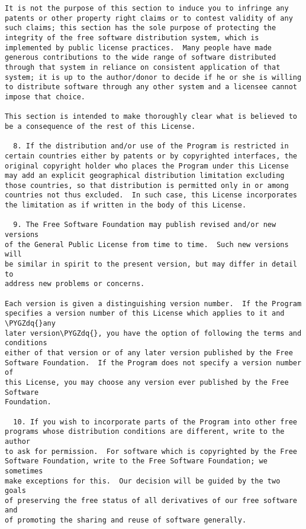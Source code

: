 \documentclass[letterpaper,10pt,english]{sphinxmanual}
\def\PYGZdq{\char`\"}
\begin{document}
\begin{Verbatim}[commandchars=\\\{\}]
It is not the purpose of this section to induce you to infringe any
patents or other property right claims or to contest validity of any
such claims; this section has the sole purpose of protecting the
integrity of the free software distribution system, which is
implemented by public license practices.  Many people have made
generous contributions to the wide range of software distributed
through that system in reliance on consistent application of that
system; it is up to the author/donor to decide if he or she is willing
to distribute software through any other system and a licensee cannot
impose that choice.

This section is intended to make thoroughly clear what is believed to
be a consequence of the rest of this License.

  8. If the distribution and/or use of the Program is restricted in
certain countries either by patents or by copyrighted interfaces, the
original copyright holder who places the Program under this License
may add an explicit geographical distribution limitation excluding
those countries, so that distribution is permitted only in or among
countries not thus excluded.  In such case, this License incorporates
the limitation as if written in the body of this License.

  9. The Free Software Foundation may publish revised and/or new versions
of the General Public License from time to time.  Such new versions will
be similar in spirit to the present version, but may differ in detail to
address new problems or concerns.

Each version is given a distinguishing version number.  If the Program
specifies a version number of this License which applies to it and \PYGZdq{}any
later version\PYGZdq{}, you have the option of following the terms and conditions
either of that version or of any later version published by the Free
Software Foundation.  If the Program does not specify a version number of
this License, you may choose any version ever published by the Free Software
Foundation.

  10. If you wish to incorporate parts of the Program into other free
programs whose distribution conditions are different, write to the author
to ask for permission.  For software which is copyrighted by the Free
Software Foundation, write to the Free Software Foundation; we sometimes
make exceptions for this.  Our decision will be guided by the two goals
of preserving the free status of all derivatives of our free software and
of promoting the sharing and reuse of software generally.


\end{Verbatim}
\end{document}

